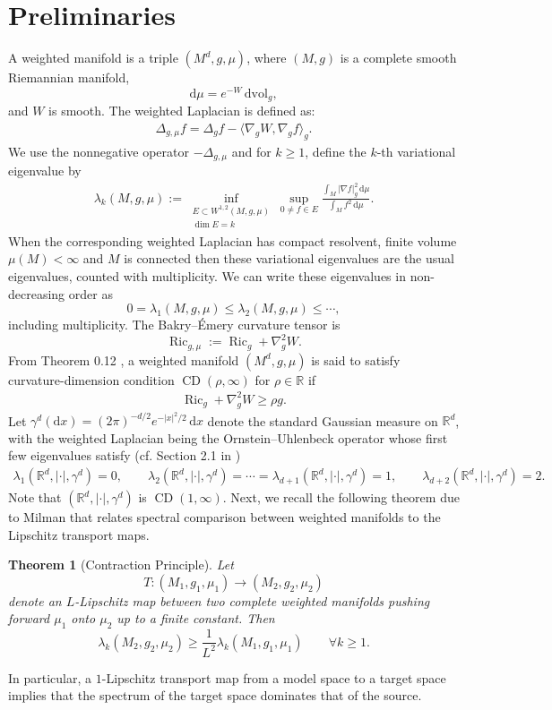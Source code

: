 \documentclass[11pt,reqno]{amsart}
\numberwithin{equation}{section}
\newtheorem{thm}{Theorem}[section]
\theoremstyle{definition}
\theoremstyle{remark}
\def\bR {\mathbb{R}}
\newcommand{\R}{\mathbb{R}}
\newcommand{\ud}{\mathrm{d}}
\newcommand{\0}{\emptyset}
\newcommand{\Ric}{\operatorname{Ric}}
\newcommand{\dvol}{\,\mathrm{dvol}}
\newcommand{\CD}{\operatorname{CD}}
\begin{document}
\section{Preliminaries}
A weighted manifold is a triple \((M^d,g,\mu)\), where \((M,g)\) is a complete
smooth Riemannian manifold,
\[
        \ud\mu=e^{-W}\dvol_g,
\]
and \(W\) is smooth. The weighted Laplacian is defined as:
\begin{align}
\Delta_{g,\mu}f= \Delta_g f-\langle\nabla_g W,\nabla_g f\rangle_g.    
\end{align}
We use the nonnegative operator $-\Delta_{g,\mu}$ and for $k\geq1$, define the $k$-th variational eigenvalue by
\begin{align}
        \lambda_k(M,g,\mu)
        :=
        \inf_{\substack{
        E\subset W^{1,2}(M,g,\mu)\\
        \dim E=k
        }}
        \sup_{0\neq f\in E}
        \frac{
        \int_M|\nabla f|_g^2\,\ud\mu
        }{
        \int_Mf^2\,\ud\mu
        }.
\end{align}
When the corresponding weighted Laplacian has compact resolvent, finite volume $\mu(M)<\infty$ and $M$ is connected then these variational eigenvalues are the usual eigenvalues, counted with multiplicity. We can write these eigenvalues in non-decreasing order as
\[
0=\lambda_1(M,g,\mu)\leq \lambda_2(M,g,
\mu)\leq\cdots,
\]
including multiplicity. The Bakry--\'Emery curvature tensor is
\[
\Ric_{g,
\mu}:=\Ric_g+\nabla_g^2W.
\]
From Theorem 0.12 \cite{lott2009ricci}, a weighted manifold $(M^d,g,\mu)$ is said to satisfy curvature-dimension condition $\CD(\rho,
\infty)$ for $\rho \in \R$ if 
\begin{align}
\Ric_g+\nabla_g^2W\geq \rho g.    
\end{align}
Let $\gamma^d(\ud x)=(2\pi)^{-d/2}e^{-|x|^2/2}\,\ud x$ denote the standard Gaussian measure on $\bR^d$, with the weighted Laplacian being the Ornstein--Uhlenbeck operator whose first few eigenvalues satisfy (cf. Section 2.1 in \cite{milman2018spectral})
\begin{align}\label{eqn:gaussian-spectrum}
\lambda_1(\R^d,|\cdot|,\gamma^d)=0,
\qquad
\lambda_2(\R^d,|\cdot|,\gamma^d)=\cdots=\lambda_{d+1}(\R^d,|\cdot|,\gamma^d)=1,
\qquad
\lambda_{d+2}(\R^d,|\cdot|,\gamma^d)=2.    
\end{align}
Note that $(\R^d,|\cdot|,\gamma^d)$ is $\CD(1,\infty).$  Next, we recall the following theorem due to Milman \cite{milman2018spectral} that relates spectral comparison between weighted manifolds to the Lipschitz transport maps.
\begin{thm}[Contraction Principle]\label{thm:contraction}
Let
\[
    T : (M_1, g_1, \mu_1) \to (M_2, g_2, \mu_2)
\]
denote an $L$-Lipschitz map between two complete weighted manifolds
pushing forward $\mu_1$ onto $\mu_2$ up to a finite constant. Then
\[
    \lambda_k(M_2, g_2, \mu_2)
    \geq
    \frac{1}{L^2}\lambda_k(M_1, g_1, \mu_1)
    \qquad \forall k \geq 1.
\]
\end{thm}
In particular, a $1$-Lipschitz transport map from a model space to a target space implies that the spectrum of the target space dominates that of the source. 
\end{document}
